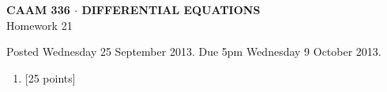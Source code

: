 \documentclass[10pt]{article}
\begin{document}
\vspace*{-5em}
\begin{center}
\large \textsf{\textbf{CAAM 336 $\cdot$ DIFFERENTIAL EQUATIONS}\\[0.5em]
Homework 21 }
\end{center}

Posted Wednesday 25 September 2013.  Due 5pm Wednesday 9 October 2013.

\begin{enumerate}\addtocounter{enumi}{20}
\item {[25 points]}  
\end{enumerate}
\end{document}

